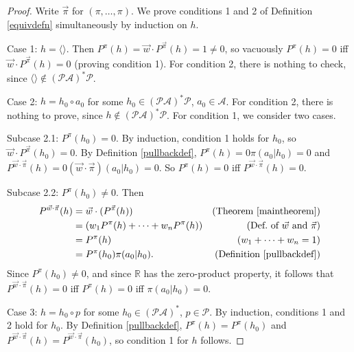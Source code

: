 \documentclass[twoside]{article}
\begin{document}
\begin{proof}
    Write $\vec\pi$ for $(\pi,\ldots,\pi)$.
    We prove conditions 1 and 2 of Definition \ref{equivdefn}
    simultaneously by induction on $h$.
 
    Case 1: $h=\langle\rangle$. Then
    $P^\pi(h)=\vec w\cdot{P^{\vec\pi}}(h)=1\not=0$, so
    vacuously $P^\pi(h)=0$ iff $\vec w\cdot{P^{\vec\pi}}(h)=0$
    (proving condition 1).
    For condition 2, there is nothing to check, since
    $\langle\rangle\not\in(\mathcal P\mathcal A)^*\mathcal P$.

    Case 2: $h=h_0\circ a_0$ for some
        $h_0\in(\mathcal P\mathcal A)^*\mathcal P$, $a_0\in\mathcal A$.
        For condition 2, there is nothing to prove, since
        $h\not\in(\mathcal P\mathcal A)^*\mathcal P$.
        For condition 1, we consider two cases.

        Subcase 2.1: $P^\pi(h_0)=0$.
        By induction, condition 1 holds for $h_0$, so
        $\vec w\cdot{P^{\vec\pi}}(h_0)=0$.
        By Definition \ref{pullbackdef},
        $P^\pi(h)=0\pi(a_0|h_0)=0$
        and $P^{\vec w\cdot\vec\pi}(h)=0(\vec w\cdot\vec\pi)(a_0|h_0)=0$.
        So $P^\pi(h)=0$ iff $P^{\vec w\cdot\vec\pi}(h)=0$.

        Subcase 2.2: $P^\pi(h_0)\not=0$.
        Then
        \begin{align*}
            P^{\vec w\cdot \vec\pi}(h)
                &= \vec w\cdot({P^{\vec\pi}}(h))
                    &\mbox{(Theorem \ref{maintheorem})}\\
                &= (w_1 P^\pi(h)+\cdots+w_n P^\pi(h))
                    &\mbox{(Def.\ of $\vec w$ and $\vec\pi$)}\\
                &= P^\pi(h)
                    &\mbox{($w_1+\cdots+w_n=1$)}\\
                &= P^\pi(h_0)\pi(a_0|h_0).
                    &\mbox{(Definition \ref{pullbackdef})}
        \end{align*}
        Since $P^\pi(h_0)\not=0$, and since $\mathbb R$ has the zero-product property,
        it follows that
        $P^{\vec w\cdot\vec\pi}(h)=0$ iff $P^\pi(h)=0$ iff $\pi(a_0|h_0)=0$.

    Case 3: $h=h_0\circ p$ for some $h_0\in (\mathcal P\mathcal A)^*$,
        $p\in\mathcal P$.
        By induction, conditions 1 and 2 hold for $h_0$.
        By Definition \ref{pullbackdef},
        $P^\pi(h)=P^\pi(h_0)$ and
        $P^{\vec w\cdot\vec\pi}(h)=P^{\vec w\cdot\vec\pi}(h_0)$,
        so condition 1 for $h$ follows.


\end{proof}
\end{document}
